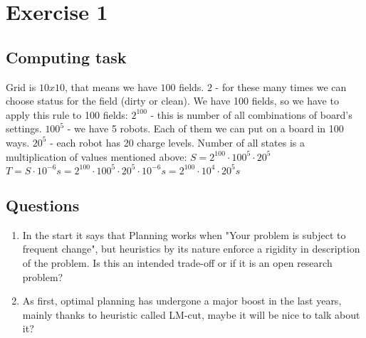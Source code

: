 





\section{Exercise 1}

\subsection{Computing task}

Grid is $10 x 10$, that means we have $100$ fields.
\newline
$2$ - for these many times we can choose status for the field (dirty or clean). We have 100 fields, so
we have to apply this rule to 100 fields:
\newline
$2^{100}$ - this is number of all combinations of board's settings.
\newline
$100^{5}$ - we have 5 robots. Each of them we can put on a board in 100 ways. 
\newline
$20^5$ - each robot has 20 charge levels.
\newline 
Number of all states is a multiplication of values mentioned above: 
$S=2^{100}\cdot100^{5}\cdot20^5$
\newline
$T=S \cdot 10^{-6}s= 2^{100} \cdot 100^{5} \cdot 20^5 \cdot 10^{-6}s = 2^{100} \cdot 10^4 \cdot 20^5s$ 



\subsection{Questions}

\begin{enumerate}
	\item {In the start it says that Planning works when "Your problem is subject to
	 frequent change", but heuristics by its nature enforce a rigidity in description of the problem. 
	 Is this an intended trade-off or if it is an open research problem?}
	\item { As first, optimal planning has undergone a major boost in the last years, mainly thanks
	 to heuristic called LM-cut, maybe it will be nice to talk about it?}
\end{enumerate}
